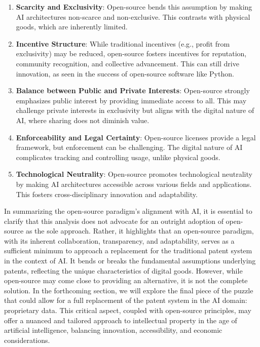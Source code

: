 \documentclass{article}[10pt]
\begin{document}
\begin{enumerate}
	\item \textbf{Scarcity and Exclusivity}: Open-source bends this assumption by making AI architectures non-scarce and non-exclusive. This contrasts with physical goods, which are inherently limited.
	\item \textbf{Incentive Structure}: While traditional incentives (e.g., profit from exclusivity) may be reduced, open-source fosters incentives for reputation, community recognition, and collective advancement. This can still drive innovation, as seen in the success of open-source software like Python.
	\item \textbf{Balance between Public and Private Interests}: Open-source strongly emphasizes public interest by providing immediate access to all. This may challenge private interests in exclusivity but aligns with the digital nature of AI, where sharing does not diminish value.
	\item \textbf{Enforceability and Legal Certainty}: Open-source licenses provide a legal framework, but enforcement can be challenging. The digital nature of AI complicates tracking and controlling usage, unlike physical goods.
	\item \textbf{Technological Neutrality}: Open-source promotes technological neutrality by making AI architectures accessible across various fields and applications. This fosters cross-disciplinary innovation and adaptability.
\end{enumerate}

In summarizing the open-source paradigm's alignment with AI, it is essential to clarify that this analysis does not advocate for an outright adoption of open-source as the sole approach. Rather, it highlights that an open-source paradigm, with its inherent collaboration, transparency, and adaptability, serves as a sufficient minimum to approach a replacement for the traditional patent system in the context of AI. It bends or breaks the fundamental assumptions underlying patents, reflecting the unique characteristics of digital goods. However, while open-source may come close to providing an alternative, it is not the complete solution. In the forthcoming section, we will explore the final piece of the puzzle that could allow for a full replacement of the patent system in the AI domain: proprietary data. This critical aspect, coupled with open-source principles, may offer a nuanced and tailored approach to intellectual property in the age of artificial intelligence, balancing innovation, accessibility, and economic considerations.
\end{document}
